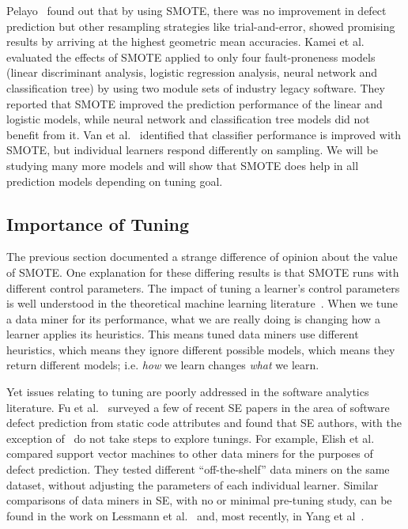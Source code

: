 \documentclass[sigconf,review, anonymous]{acmart}
\theoremstyle{break}
\theoremstyle{break}
\begin{document}
Pelayo~\cite{pelayo2007applying} found out that by using SMOTE, there was no improvement in defect prediction but other resampling strategies like trial-and-error, showed promising results by arriving at the highest geometric mean accuracies. Kamei et al.~\cite{kamei2007effects} evaluated the effects of SMOTE applied to only four fault-proneness models
(linear discriminant analysis, logistic regression
analysis, neural network and classification tree) by
using two module sets of industry legacy software. They reported that SMOTE improved the prediction performance of the linear and logistic models, while neural network and classification tree models did not
benefit from it. Van et al.~\cite{van2007experimental} identified that classifier performance is improved with SMOTE, but individual learners respond differently on sampling. We will be studying many more models and will show that SMOTE does help in all prediction models depending on tuning goal.

\subsection{Importance of Tuning}
\label{sect:tune}

The previous section documented a strange difference of opinion
about the value of SMOTE. One explanation for these differing results 
is that SMOTE runs with different control parameters.
The impact of tuning a learner's control parameters is well understood in the theoretical machine learning literature~\cite{bergstra2012random}.  When we tune a
data miner for its performance, what we are really doing is changing how a learner applies its
heuristics. This means tuned data miners use different heuristics, which means
they ignore different possible models, which means they return different models;
i.e. \textit{how} we learn changes \textit{what} we learn.

Yet issues relating to
tuning are poorly addressed in the software analytics literature. Fu et al.~\cite{fu2016tuning} surveyed a few of recent SE papers in the area
of software defect prediction from static code attributes and found that SE
  authors, with the exception of~\cite{tantithamthavorn2016icse} do not take steps to explore tunings. For example, Elish et
  al.~\cite{elish2008predicting} compared support vector machines to other data
  miners for the purposes of defect prediction. They tested different
  ``off-the-shelf'' data miners on the same dataset, without adjusting the
  parameters of each individual learner. Similar comparisons of data miners in SE,
with no or minimal pre-tuning study, can be found in the work on Lessmann et al.~\cite{4527256}
and, most recently, in Yang et al~\cite{Yang:2016}.  
\end{document}

